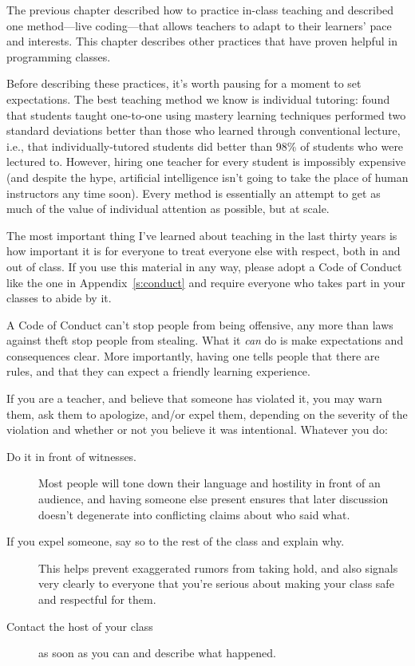 
The previous chapter described how to practice in-class teaching and
described one method---live coding---that allows teachers to adapt to their
learners' pace and interests. This chapter describes other practices
that have proven helpful in programming classes.

Before describing these practices, it's worth pausing for a moment to
set expectations. The best teaching method we know is individual
tutoring: \cite{Bloo1984} found that students taught one-to-one using
mastery learning techniques performed two standard deviations better
than those who learned through conventional lecture, i.e., that
individually-tutored students did better than 98\% of students who were
lectured to. However, hiring one teacher for every student is impossibly
expensive (and despite the hype, artificial intelligence isn't going to
take the place of human instructors any time soon). Every method is
essentially an attempt to get as much of the value of individual
attention as possible, but at scale.


The most important thing I've learned about teaching in the last thirty years is
how important it is for everyone to treat everyone else with respect,
both in and out of class.
If you use this material in any way,
please adopt a Code of Conduct like the one in Appendix~\ref{s:conduct}
and require everyone who takes part in your classes to abide by it.

A Code of Conduct can't stop people from being offensive,
any more than laws against theft stop people from stealing.
What it \emph{can} do is make expectations and consequences clear.
More importantly,
having one tells people that there are rules,
and that they can expect a friendly learning experience.

If you are a teacher, and believe that someone has violated it, you may warn them,
ask them to apologize, and/or expel them, depending on the severity of
the violation and whether or not you believe it was intentional.
Whatever you do:

\begin{description}

\item[Do it in front of witnesses.]
Most people will tone down their language and hostility in front of
an audience, and having someone else present ensures that later
discussion doesn't degenerate into conflicting claims about who said
what.

\item[If you expel someone, say so to the rest of the class and explain why.]
This helps prevent exaggerated rumors from taking hold, and
also signals very clearly to everyone that you're serious about
making your class safe and respectful for them.

\item[Contact the host of your class]
as soon as you can and describe what happened.

\end{description}

